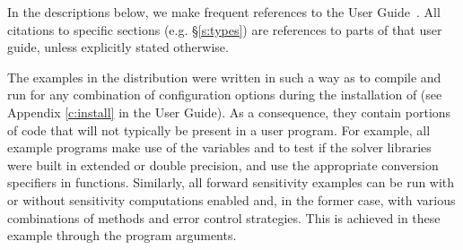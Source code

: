 In the descriptions below, we make frequent references to the {\idas}
User Guide~\cite{idas_ug}.  All citations to specific sections
(e.g. \S\ref{s:types}) are references to parts of that user guide, unless
explicitly stated otherwise.

\vspace{0.2in}
The examples in the {\idas} distribution were written in such a way as
to compile and run for any combination of configuration options during
the installation of {\sundials} (see Appendix \ref{c:install} in the User Guide).
As a consequence, they contain portions of code that will not typically be present in a
user program. For example, all example programs make use of the
variables  and 
to test if the solver libraries
were built in extended or double precision, and use the appropriate conversion 
specifiers in  functions. Similarly, all forward sensitivity
examples can be run with or without sensitivity computations enabled and,
in the former case, with various combinations of methods and error control 
strategies. This is achieved in these example through the program arguments.


